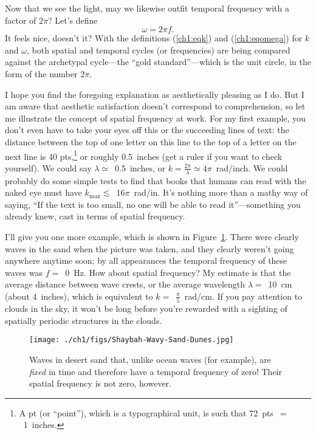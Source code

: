 Now that we see the light, may we likewise outfit temporal frequency with a
factor of $2 \pi$? Let's define
\begin{equation}
  \label{ch1:eqomega}
  \omega = 2 \pi f.
\end{equation}
It feels nice, doesn't it? With the definitions (\ref{ch1:eqk}) and
(\ref{ch1:eqomega}) for $k$ and $\omega$, both spatial and temporal cycles (or
frequencies) are being compared against the archetypal cycle---the ``gold
standard''---which is the unit circle, in the form of the number 2$\pi$.

I hope you find the foregoing explanation as aesthetically pleasing as I do. But
I am aware that aesthetic satisfaction doesn't correspond to comprehension, so
let me illustrate the concept of spatial frequency at work. For my first
example, you don't even have to take your eyes off this or the succeeding lines
of text: the distance between the top of one letter on this line to the top of a
letter on the next line is 40 pts,\footnote{A pt (or ``point''), which is a
  typographical unit, is such that 72~pts~$=$~1~inches.}  or roughly 0.5~inches
(get a ruler if you want to check yourself). We could say
$\lambda \simeq$~0.5~inches, or
$k = \frac{2 \pi}{\lambda} \simeq 4 \pi$~rad/inch. We could probably do some
simple tests to find that books that humans can read with the naked eye must
have $k_{\textrm{max}} \lesssim$~16$\pi$~rad/in. It's nothing more than a mathy
way of saying, ``If the text is too small, no one will be able to read
it''---something you already knew, cast in terms of spatial frequency.

I'll give you one more example, which is shown in
Figure~\ref{ch1:FigDesert}. There were clearly waves in the sand when the
picture was taken, and they clearly weren't going anywhere anytime soon; by all
appearances the temporal frequency of these waves was $f =$~0~Hz.  How about
spatial frequency? My estimate is that the average distance between wave crests,
or the average wavelength $\lambda =$~10~cm (about 4~inches), which is
equivalent to $k =$~$\frac{\pi}{5}$~rad/cm.  If you pay attention to clouds in
the sky, it won't be long before you're rewarded with a sighting of spatially
periodic structures in the clouds.


\begin{figure}
  \centering
  \noindent\texttt{[image: ./ch1/figs/Shaybah-Wavy-Sand-Dunes.jpg]}
  \caption[Desert waves]{Waves in desert sand that, unlike ocean waves (for
    example), are \emph{fixed} in time and therefore have a temporal frequency of
    zero! Their spatial frequency is not zero, however.}
  \label{ch1:FigDesert}
\end{figure}

